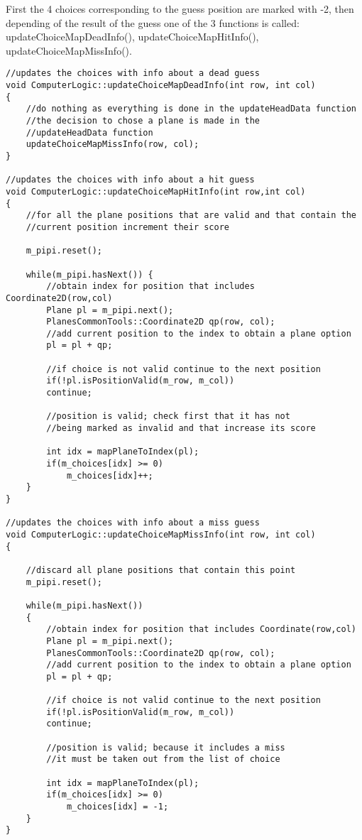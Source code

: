First the 4 choices corresponding to the guess position are marked with -2, then depending of the result of the guess one of the 3 functions is called: updateChoiceMapDeadInfo(), updateChoiceMapHitInfo(), updateChoiceMapMissInfo(). 

\begin{lstlisting}
//updates the choices with info about a dead guess
void ComputerLogic::updateChoiceMapDeadInfo(int row, int col)
{
	//do nothing as everything is done in the updateHeadData function
	//the decision to chose a plane is made in the
	//updateHeadData function
	updateChoiceMapMissInfo(row, col);
}

//updates the choices with info about a hit guess
void ComputerLogic::updateChoiceMapHitInfo(int row,int col)
{
	//for all the plane positions that are valid and that contain the
	//current position increment their score
	
	m_pipi.reset();
	
	while(m_pipi.hasNext()) {
		//obtain index for position that includes Coordinate2D(row,col)
		Plane pl = m_pipi.next();
		PlanesCommonTools::Coordinate2D qp(row, col);
		//add current position to the index to obtain a plane option
		pl = pl + qp;
		
		//if choice is not valid continue to the next position
		if(!pl.isPositionValid(m_row, m_col))
		continue;
		
		//position is valid; check first that it has not
		//being marked as invalid and that increase its score
		
		int idx = mapPlaneToIndex(pl);
		if(m_choices[idx] >= 0)
			m_choices[idx]++;
	}
}

//updates the choices with info about a miss guess
void ComputerLogic::updateChoiceMapMissInfo(int row, int col)
{

	//discard all plane positions that contain this point
	m_pipi.reset();
	
	while(m_pipi.hasNext())
	{
		//obtain index for position that includes Coordinate(row,col)
		Plane pl = m_pipi.next();
		PlanesCommonTools::Coordinate2D qp(row, col);
		//add current position to the index to obtain a plane option
		pl = pl + qp;
		
		//if choice is not valid continue to the next position
		if(!pl.isPositionValid(m_row, m_col))
		continue;
		
		//position is valid; because it includes a miss
		//it must be taken out from the list of choice
		
		int idx = mapPlaneToIndex(pl);
		if(m_choices[idx] >= 0)
			m_choices[idx] = -1;
	}
}
\end{lstlisting}

